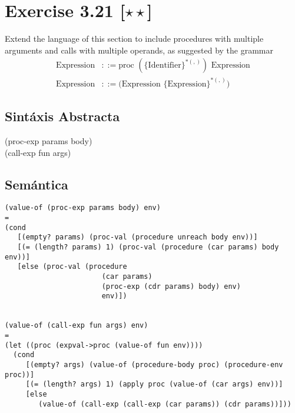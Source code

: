\documentclass[11pt]{article}
\begin{document}
\section*{Exercise 3.21 [$\star \star$]}
Extend the language of this section to include procedures with multiple arguments and calls with multiple operands, as suggested by the grammar
\begin{align*}
\text{Expression}	&::= \text{proc } (\{\text{Identifier}\}^{*(,)}) \text{ Expression} \\
\text{Expression} &::= \text{(Expression } \{\text{Expression}\}^{*(,)})
\end{align*}

\subsection*{Sintáxis Abstracta}
\begin{center}
(proc-exp params body) \\
(call-exp fun args)
\end{center}

\subsection*{Semántica}
\begin{lstlisting}[mathescape]
(value-of (proc-exp params body) env)
=
(cond
   [(empty? params) (proc-val (procedure unreach body env))]
   [(= (length? params) 1) (proc-val (procedure (car params) body env))]
   [else (proc-val (procedure
                       (car params) 
                       (proc-exp (cdr params) body) env)
                       env)])                        
        
        
(value-of (call-exp fun args) env)
=
(let ((proc (expval->proc (value-of fun env))))
  (cond
     [(empty? args) (value-of (procedure-body proc) (procedure-env proc))]
     [(= (length? args) 1) (apply proc (value-of (car args) env))]
     [else 
        (value-of (call-exp (call-exp (car params)) (cdr params))]))                  
\end{lstlisting}
\newpage
\end{document}
